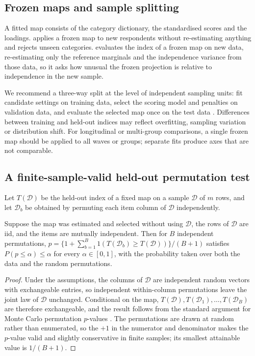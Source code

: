 \subsection{Frozen maps and sample splitting}
A fitted map consists of the category dictionary, the standardised scores and the loadings.  applies a frozen map to new respondents without re-estimating anything and rejects unseen categories.  evaluates the index of a frozen map on new data, re-estimating only the reference marginals and the independence variance from those data, so it asks how unusual the frozen projection is relative to independence in the new sample.

We recommend a three-way split at the level of independent sampling units: fit candidate settings on training data, select the scoring model and penalties on validation data, and evaluate the selected map once on the test data \citep{cox1975}. Differences between training and held-out indices may reflect overfitting, sampling variation or distribution shift. For longitudinal or multi-group comparisons, a single frozen map should be applied to all waves or groups; separate fits produce axes that are not comparable.

\subsection{A finite-sample-valid held-out permutation test}
Let $T(\mathcal D)$ be the held-out index of a fixed map on a sample $\mathcal D$ of $m$ rows, and let $\mathcal D_b$ be obtained by permuting each item column of $\mathcal D$ independently.

\begin{proposition}\label{prop:heldout}
Suppose the map was estimated and selected without using $\mathcal D$, the rows of $\mathcal D$ are iid, and the items are mutually independent. Then for $B$ independent permutations, $p=\{1+\sum_{b=1}^B1(T(\mathcal D_b)\ge T(\mathcal D))\}/(B+1)$ satisfies $P(p\le\alpha)\le\alpha$ for every $\alpha\in[0,1]$, with the probability taken over both the data and the random permutations.
\end{proposition}
\begin{proof}
Under the assumptions, the columns of $\mathcal D$ are independent random vectors with exchangeable entries, so independent within-column permutations leave the joint law of $\mathcal D$ unchanged. Conditional on the map, $T(\mathcal D),T(\mathcal D_1),\ldots,T(\mathcal D_B)$ are therefore exchangeable, and the result follows from the standard argument for Monte Carlo permutation $p$-values \citep{phipson2010}. The permutations are drawn at random rather than enumerated, so the $+1$ in the numerator and denominator makes the $p$-value valid and slightly conservative in finite samples; its smallest attainable value is $1/(B+1)$.
\end{proof}

